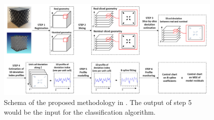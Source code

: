 \begin{figure}
    \centering
    \includegraphics[scale=0.5]{Images/colosimosplines.png}
    \caption[Functional control chart in complex geometries.]{Schema of the proposed methodology in \cite{colosimo_complex_2022}. The output of step 5 would be the input for the classification algorithm.}
    \label{fig:colosimofunctional}
\end{figure}




